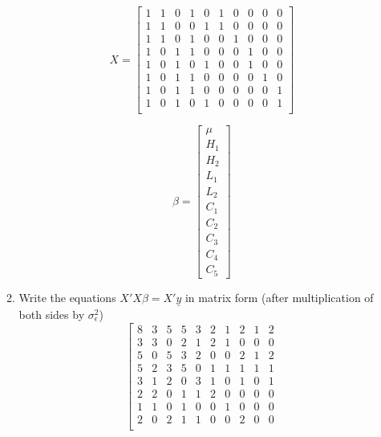 \documentclass[12pt,a4paper]{paper}
\begin{document}
\begin{enumerate}
\begin{enumerate}
\begin{minipage}[c]{0.2\linewidth}
\end{minipage}
\begin{minipage}[c]{0.5\linewidth}
\[X = \left[\begin{array}{cccccccccc}
1 & 1 & 0 & 1 & 0 & 1 & 0 & 0 & 0 & 0 \\ 
  1 & 1 & 0 & 0 & 1 & 1 & 0 & 0 & 0 & 0 \\ 
  1 & 1 & 0 & 1 & 0 & 0 & 1 & 0 & 0 & 0 \\ 
  1 & 0 & 1 & 1 & 0 & 0 & 0 & 1 & 0 & 0 \\ 
  1 & 0 & 1 & 0 & 1 & 0 & 0 & 1 & 0 & 0 \\ 
  1 & 0 & 1 & 1 & 0 & 0 & 0 & 0 & 1 & 0 \\ 
  1 & 0 & 1 & 1 & 0 & 0 & 0 & 0 & 0 & 1 \\ 
  1 & 0 & 1 & 0 & 1 & 0 & 0 & 0 & 0 & 1 \\ 
\end{array}\right]\]
\end{minipage}
\begin{minipage}[c]{0.2\linewidth}
\[\beta = \left[\begin{array}{c}\mu\\H_{1}\\H_{2}\\L_{1}\\L_{2}\\C_{1}\\C_{2}\\C_{3}\\C_{4}\\C_{5}\end{array}\right]\]
\end{minipage}
\item Write the equations $X'X\beta = X'\underline{y}$ in matrix form (after multiplication of both sides by $\sigma^{2}_{\epsilon}$)
\[\left[\begin{array}{cccccccccc}
8 & 3 & 5 & 5 & 3 & 2 & 1 & 2 & 1 & 2 \\ 
  3 & 3 & 0 & 2 & 1 & 2 & 1 & 0 & 0 & 0 \\ 
  5 & 0 & 5 & 3 & 2 & 0 & 0 & 2 & 1 & 2 \\ 
  5 & 2 & 3 & 5 & 0 & 1 & 1 & 1 & 1 & 1 \\ 
  3 & 1 & 2 & 0 & 3 & 1 & 0 & 1 & 0 & 1 \\ 
  2 & 2 & 0 & 1 & 1 & 2 & 0 & 0 & 0 & 0 \\ 
  1 & 1 & 0 & 1 & 0 & 0 & 1 & 0 & 0 & 0 \\ 
  2 & 0 & 2 & 1 & 1 & 0 & 0 & 2 & 0 & 0 \\ 

\end{array}\]
\end{enumerate}
\end{enumerate}
\end{document}
